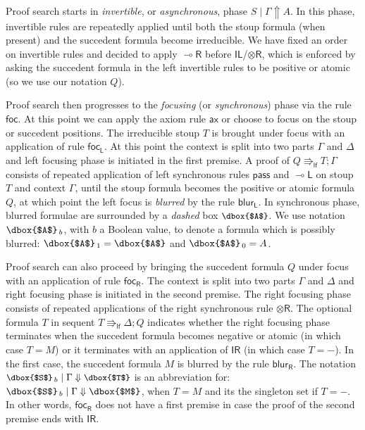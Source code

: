 \documentclass[runningheads]{llncs}
\newcommand{\tr}{\otimes \mathsf{R}}
\newcommand{\lright}{{\multimap}\mathsf{R}}
\newcommand{\lleft}{{\multimap}\mathsf{L}}
\newcommand{\pass}{\mathsf{pass}}
\newcommand{\unitl}{\mathsf{IL}}
\newcommand{\unitr}{\mathsf{IR}}
\newcommand{\otR}{\tr}
\newcommand{\lolliR}{\lright}
\newcommand{\lolliL}{\lleft}
\newcommand{\IL}{\unitl}
\newcommand{\IR}{\unitr}
\newcommand{\ax}{\mathsf{ax}}
\newcommand{\lf}{\Rrightarrow_\mathsf{lf}}
\newcommand{\up}{\Uparrow}
\newcommand{\dn}{\Downarrow}
\newcommand{\focL}{\mathsf{foc_L}}
\newcommand{\foc}{\mathsf{foc}}
\newcommand{\focR}{\mathsf{foc_R}}
\newcommand{\blurL}{\mathsf{blur_L}}
\newcommand{\blurR}{\mathsf{blur_R}}
\begin{document}
Proof search starts in \emph{invertible}, or \emph{asynchronous}, phase $S \mid \Gamma \up A$. In this phase, invertible rules are repeatedly applied until both the stoup formula (when present) and the succedent formula become irreducible. We have fixed an order on invertible rules and decided to apply $\lolliR$ before $\IL$/$\otR$, which is enforced by asking the succedent formula in the left invertible rules to be positive or atomic (so we use our notation $Q$). 

Proof search then progresses to the \emph{focusing} (or \emph{synchronous}) phase via the rule $\foc$. At this point we can apply the axiom rule $\ax$ or choose to focus on the stoup or succedent positions.
The irreducible stoup $T$ is brought under focus with an application of rule $\focL$. At this point the context is split into two parts $\Gamma$ and $\Delta$ and left focusing phase is initiated in the first premise. A proof of $Q \lf T ; \Gamma$ consists of repeated application of left synchronous rules $\pass$ and $\lolliL$ on stoup $T$ and context $\Gamma$, until the stoup formula becomes the positive or atomic formula $Q$, at which point the left focus is \emph{blurred} by the rule $\blurL$. In synchronous phase, blurred formulae are surrounded by a \emph{dashed} box ${\small{\dbox{$A$}}}$. We use notation {\small{$\dbox{$A$}_{\,b}$}}, with $b$ a Boolean value, to denote a formula which is possibly blurred: {\small{$\dbox{$A$}_{\,1} = \dbox{$A$}$}} and {\small{$\dbox{$A$}_{\,0} = A$}}.

Proof search can also proceed by bringing the succedent formula $Q$ under focus with an application of rule $\focR$. The context is split into two parts $\Gamma$ and $\Delta$ and right focusing phase is initiated in the second premise. The right focusing phase consists of repeated applications of the right synchronous rule $\otR$. The optional formula $T$ in sequent $T \lf \Delta ; Q$ indicates whether the right focusing phase terminates when the succedent formula becomes negative or atomic (in which case $T = M$) or it terminates with an application of $\IR$ (in which case $T = -$). In the first case, the succedent formula $M$ is blurred by the rule $\blurR$. The notation $\small\dbox{$S$}_{\, b} \mid \Gamma \dn \dbox{$T$}$ is an abbreviation for: $\dbox{$S$}_{\, b} \mid \Gamma \dn \dbox{$M$}$, when $T = M$ and its the singleton set if $T = -$. In other words, $\focR$ does not have a first premise in case the proof of the second premise ends with $\IR$.
\end{document}
